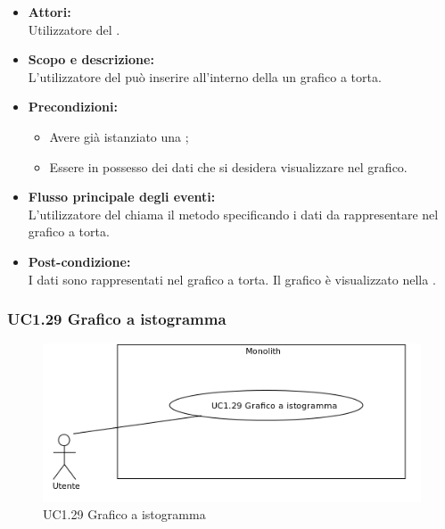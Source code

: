 \begin{itemize}
	\item \textbf{Attori:}
	\\Utilizzatore del .
	\item \textbf{Scopo e descrizione:} 
	\\L'utilizzatore del  può inserire all'interno della  un grafico a torta.
	\item \textbf{Precondizioni:}
	\begin{itemize}
		\item Avere già istanziato una ;
		\item Essere in possesso dei dati che si desidera visualizzare nel grafico.
	\end{itemize}
	\item \textbf{Flusso principale degli eventi:}
	\\L'utilizzatore del  chiama il metodo specificando i dati da rappresentare nel grafico a torta.
	\item \textbf{Post-condizione:}
	\\I dati sono rappresentati nel grafico a torta. Il grafico è visualizzato nella .
\end{itemize}

\subsubsection{UC1.29 Grafico a istogramma} \label{UC1.29}

\begin{figure}[H]
	\centering
	\includegraphics[width=15cm]{../../documenti/AnalisiDeiRequisiti/Diagrammi_img/uc1_29.png}
	\caption{UC1.29 Grafico a istogramma}
\end{figure}

